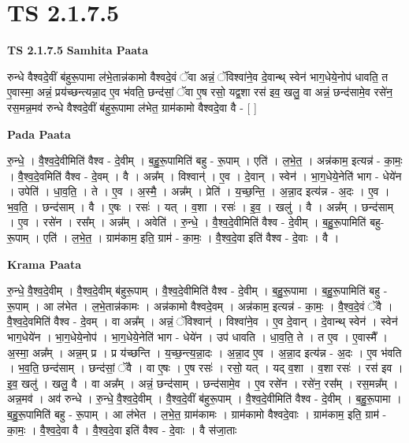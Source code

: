 \documentclass[17pt]{extarticle}
\begin{document}
\section{ TS 2.1.7.5 }

\textbf{TS 2.1.7.5 } \newline
\textbf{Samhita Paata} \newline

रुन्धे वैश्वदे॒वीं ब॑हुरू॒पामा ल॑भे॒तान्न॑कामो वैश्वदे॒वं ॅवा अन्नं॒ ॅविश्वा॑ने॒व दे॒वान्थ् स्वेन॑ भाग॒धेये॒नोप॑ धावति॒ त ए॒वास्मा॒ अन्नं॒  प्रय॑च्छन्त्यन्ना॒द ए॒व भ॑वति॒ छन्द॑सां॒ ॅवा ए॒ष रसो॒ यद्व॒शा रस॑ इव॒ खलु॒ वा अन्नं॒ छन्द॑सामे॒व रसे॑न॒ रस॒मन्न॒मव॑ रुन्धे वैश्वदे॒वीं ब॑हुरू॒पामा ल॑भेत॒ ग्राम॑कामो वैश्वदे॒वा वै - [  ] \newline

\textbf{Pada Paata} \newline

रु॒न्धे॒ । वै॒श्व॒दे॒वीमिति॑ वैश्व - दे॒वीम् । ब॒हु॒रू॒पामिति॑ बहु - रू॒पाम् । एति॑ । ल॒भे॒त॒ । अन्न॑काम॒ इत्यन्न॑ - का॒मः॒ । वै॒श्व॒दे॒वमिति॑ वैश्व - दे॒वम् । वै । अन्न᳚म् । विश्वान्॑ । ए॒व । दे॒वान् । स्वेन॑ । भा॒ग॒धेये॒नेति॑ भाग - धेये॑न । उपेति॑ । धा॒व॒ति॒ । ते । ए॒व । अ॒स्मै॒ । अन्न᳚म् । प्रेति॑ । य॒च्छ॒न्ति॒ । अ॒न्ना॒द इत्य॑न्न - अ॒दः । ए॒व । भ॒व॒ति॒ । छन्द॑साम् । वै । ए॒षः । रसः॑ । यत् । व॒शा । रसः॑ । इ॒व॒ । खलु॑ । वै । अन्न᳚म् । छन्द॑साम् । ए॒व । रसे॑न । रस᳚म् । अन्न᳚म् । अवेति॑ । रु॒न्धे॒ । वै॒श्व॒दे॒वीमिति॑ वैश्व - दे॒वीम् । ब॒हु॒रू॒पामिति॑ बहु-रू॒पाम् । एति॑ । ल॒भे॒त॒ । ग्राम॑काम॒ इति॒ ग्राम॑ - का॒मः॒ । वै॒श्व॒दे॒वा इति॑ वैश्व - दे॒वाः । वै ।  \newline


\textbf{Krama Paata} \newline

रु॒न्धे॒ वै॒श्व॒दे॒वीम् । वै॒श्व॒दे॒वीम् ब॑हुरू॒पाम् । वै॒श्व॒दे॒वीमिति॑ वैश्व - दे॒वीम् । ब॒हु॒रू॒पामा । ब॒हु॒रू॒पामिति॑ बहु - रू॒पाम् । आ ल॑भेत । ल॒भे॒तान्न॑कामः । अन्न॑कामो वैश्वदे॒वम् । अन्न॑काम॒ इत्यन्न॑ - का॒मः॒ । वै॒श्व॒दे॒वं ॅवै । वै॒श्व॒दे॒वमिति॑ वैश्व - दे॒वम् । वा अन्न᳚म् । अन्नं॒ ॅविश्वान्॑ । विश्वा॑ने॒व । ए॒व दे॒वान् । दे॒वान्थ् स्वेन॑ । स्वेन॑ भाग॒धेये॑न । भा॒ग॒धेये॒नोप॑ । भा॒ग॒धेये॒नेति॑ भाग - धेये॑न । उप॑ धावति । धा॒व॒ति॒ ते । त ए॒व । ए॒वास्मै᳚ । अ॒स्मा॒ अन्न᳚म् । अन्न॒म् प्र । प्र य॑च्छन्ति । य॒च्छ॒न्त्य॒न्ना॒दः । अ॒न्ना॒द ए॒व । अ॒न्ना॒द इत्य॑न्न - अ॒दः । ए॒व भ॑वति । भ॒व॒ति॒ छन्द॑साम् । छन्द॑सां॒ ॅवै । वा ए॒षः । ए॒ष रसः॑ । रसो॒ यत् । यद् व॒शा । व॒शा रसः॑ । रस॑ इव । इ॒व॒ खलु॑ । खलु॒ वै । वा अन्न᳚म् । अन्नं॒ छन्द॑साम् । छन्द॑सामे॒व । ए॒व रसे॑न । रसे॑न॒ रस᳚म् । रस॒मन्न᳚म् । अन्न॒मव॑ । अव॑ रुन्धे । रु॒न्धे॒ वै॒श्व॒दे॒वीम् । वै॒श्व॒दे॒वीं ब॑हुरू॒पाम् । वै॒श्व॒दे॒वीमिति॑ वैश्व - दे॒वीम् । ब॒हु॒रू॒पामा । ब॒हु॒रू॒पामिति॑ बहु - रू॒पाम् । आ ल॑भेत । ल॒भे॒त॒ ग्राम॑कामः । ग्राम॑कामो वैश्वदे॒वाः । ग्राम॑काम॒ इति॒ ग्राम॑ - का॒मः॒ । वै॒श्व॒दे॒वा वै । वै॒श्व॒दे॒वा इति॑ वैश्व - दे॒वाः । वै स॑जा॒ताः \newline
\end{document}
